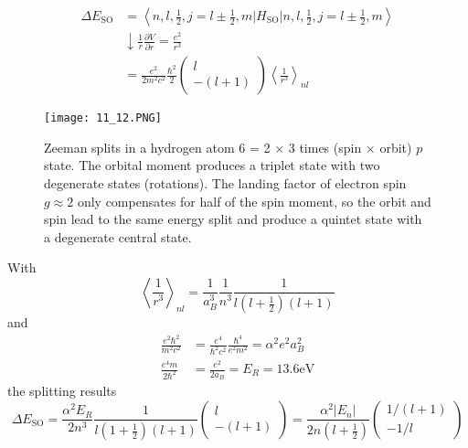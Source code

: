 \begin{equation}
\begin{aligned} \Delta E_{\mathrm{SO}} &=\left\langle n, l, \frac{1}{2}, j=l \pm \frac{1}{2}, m\left|H_{\mathrm{SO}}\right| n, l, \frac{1}{2}, j=l \pm \frac{1}{2}, m\right\rangle \\ & \downarrow \frac{1}{r} \frac{\partial V}{\partial r}=\frac{e^{2}}{r^{3}} \\ &=\frac{e^{2}}{2 m^{2} c^{2}} \frac{\hbar^{2}}{2}\left(\begin{array}{c}{l} \\ {-(l+1)}\end{array}\right)\left\langle\frac{1}{r^{3}}\right\rangle_{n l} \end{aligned}
\end{equation}
\begin{figure}[ht]
        \centering
        \texttt{[image: 11\_12.PNG]}
        \caption{Zeeman splits in a hydrogen atom 6 = 2 × 3 times (spin × orbit) $ p $ state. The orbital moment produces a triplet state with two degenerate states (rotations). The landing factor of electron spin $ g \approx 2 $ only compensates for half of the spin moment, so the orbit and spin lead to the same energy split and produce a quintet state with a degenerate central state.}
\end{figure}
With
\begin{equation}
    \left\langle\frac{1}{r^{3}}\right\rangle_{n l}=\frac{1}{a_{B}^{3}} \frac{1}{n^{3}} \frac{1}{l\left(l+\frac{1}{2}\right)(l+1)}
    \end{equation}
and
\begin{equation}
\begin{aligned} \frac{e^{2} \hbar^{2}}{m^{2} c^{2}} &=\frac{e^{4}}{\hbar^{2} c^{2}} \frac{\hbar^{4}}{e^{2} m^{2}}=\alpha^{2} e^{2} a_{B}^{2} \\ \frac{e^{4} m}{2 \hbar^{2}} &=\frac{e^{2}}{2 a_{B}}=E_{R}=13.6 \mathrm{eV} \end{aligned}
\end{equation}
the splitting results
\begin{equation}
\Delta E_{\mathrm{SO}}=\frac{\alpha^{2} E_{R}}{2 n^{3}} \frac{1}{l\left(1+\frac{1}{2}\right)(l+1)}\left(\begin{array}{c}{l} \\ {-(l+1)}\end{array}\right)=\frac{\alpha^{2}\left|E_{n}\right|}{2 n\left(l+\frac{1}{2}\right)}\left(\begin{array}{c}{1 /(l+1)} \\ {-1 / l}\end{array}\right)
\end{equation}
